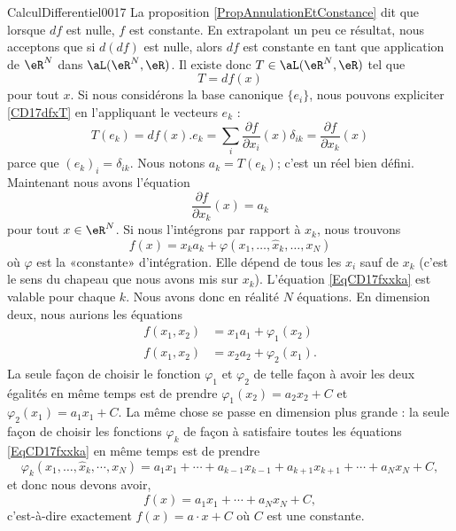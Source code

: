 \begin{corrige}{CalculDifferentiel0017}
	La proposition \ref{PropAnnulationEtConstance} dit que lorsque $df$ est nulle, $f$ est constante. En extrapolant un peu ce résultat, nous acceptons que si $d(df)$ est nulle, alors $df$ est constante en tant que application de $\eR^N$ dans $\aL(\eR^N,\eR)$. Il existe donc $T\in\aL(\eR^N,\eR)$ tel que
	\begin{equation}		\label{CD17dfxT}
		T=df(x)
	\end{equation}
	pour tout $x$. Si nous considérons la base canonique $\{ e_i \}$, nous pouvons expliciter \eqref{CD17dfxT} en l'appliquant le vecteurs $e_k$ :
	\begin{equation}
		T(e_k)=df(x).e_k=\sum_i\frac{ \partial f }{ \partial x_i }(x)\delta_{ik}=\frac{ \partial f }{ \partial x_k }(x)
	\end{equation}
	parce que $(e_k)_i=\delta_{ik}$. Nous notons $a_k=T(e_k)$; c'est un réel bien défini. Maintenant nous avons l'équation
	\begin{equation}
		\frac{ \partial f }{ \partial x_k }(x)=a_k
	\end{equation}
	pour tout $x\in\eR^N$. Si nous l'intégrons par rapport à $x_k$, nous trouvons
	\begin{equation}		\label{EqCD17fxxka}
		f(x)=x_ka_k+\varphi(x_1,\ldots,\hat x_k,\ldots,x_N)
	\end{equation}
	où $\varphi$ est la «constante» d'intégration. Elle dépend de tous les $x_i$ sauf de $x_k$ (c'est le sens du chapeau que nous avons mis sur $x_k$). L'équation \eqref{EqCD17fxxka} est valable pour chaque $k$. Nous avons donc en réalité $N$ équations. En dimension deux, nous aurions les équations
	\begin{subequations}
		\begin{align}
			f(x_1,x_2)&=x_1a_1+\varphi_1(x_2)\\
			f(x_1,x_2)&=x_2a_2+\varphi_2(x_1).
		\end{align}
	\end{subequations}
	La seule façon de choisir le fonction $\varphi_1$ et $\varphi_2$ de telle façon à avoir les deux égalités en même temps est de prendre $\varphi_1(x_2)=a_2x_2+C$ et $\varphi_2(x_1)=a_1x_1+C$. La même chose se passe en dimension plus grande : la seule façon de choisir les fonctions $\varphi_k$ de façon à satisfaire toutes les équations \eqref{EqCD17fxxka} en même temps est de prendre
	\begin{equation}
		\varphi_k(x_1,\ldots,\hat x_k,\cdots,x_N)=a_1x_1+\cdots+a_{k-1}x_{k-1}+a_{k+1}x_{k+1}+\cdots+a_Nx_N+C,
	\end{equation}
	et donc nous devons avoir,
	\begin{equation}
		f(x)=a_1x_1+\cdots+a_Nx_N+C,
	\end{equation}
	c'est-à-dire exactement $f(x)=a\cdot x+C$ où $C$ est une constante.

\end{corrige}
